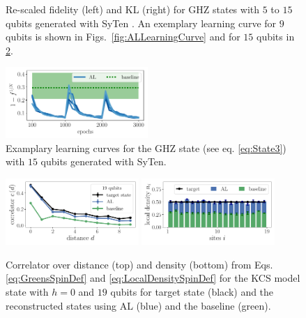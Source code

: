 \documentclass[pra,aps,showpacs,groupedaddress,superscriptaddress,twocolumn,toc=flat,biblatex,footinbib]{revtex4-1}
\begin{document}
\begin{figure}[t]
\begin{minipage}[t]{0.23\textwidth}
\end{minipage}
\caption[]{Re-scaled fidelity (left) and KL (right) for GHZ states with $5$ to $15$ qubits generated with SyTen \cite{syten1,syten2}. An exemplary learning curve for $9$ qubits is shown in Figs.~\ref{fig:ALLearningCurve} and for $15$ qubits in \ref{fig:Example_GHZ15_MPS}.}
 \label{fig:GHZ_pyten}
\end{figure}

\begin{figure}[t]
	\centering
  \includegraphics[width=0.48\textwidth]{Paper/Graphics/GHZ_fidelity_15_qubits_summary.pdf}
	\caption[]{Examplary learning curves for the GHZ state (see eq. \eqref{eq:State3}) with $15$ qubits generated with SyTen.}
	\label{fig:Example_GHZ15_MPS}
\end{figure}



\begin{figure}[t]
	\centering
   \includegraphics[width=0.45\textwidth]{Paper/Graphics/LGT_different_threshold_correlator_19_qubits.pdf}
   \includegraphics[width=0.45\textwidth]{Paper/Graphics/LGT_different_threshold_density_19_qubits.pdf}
	\caption[]{Correlator over distance (top) and density (bottom) from Eqs. \eqref{eq:GreensSpinDef} and \eqref{eq:LocalDensitySpinDef} for the KCS model state with $h=0$ and $19$ qubits for target state (black) and the reconstructed states using AL (blue) and the baseline (green).}
	\label{fig:LGT_h=0_2}
\end{figure}
\end{document}
